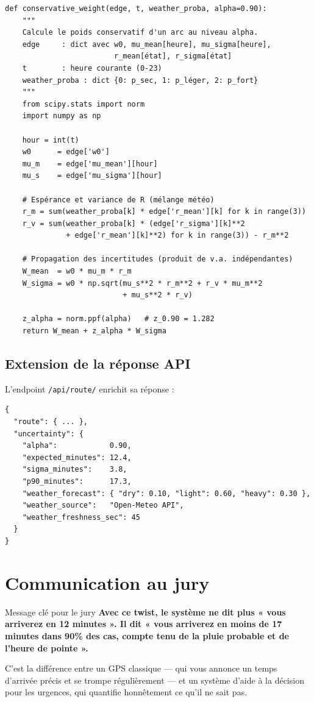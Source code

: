 \documentclass[12pt,a4paper]{article}
\theoremstyle{definition}
\theoremstyle{remark}
\begin{document}
\begin{verbatim}
def conservative_weight(edge, t, weather_proba, alpha=0.90):
    """
    Calcule le poids conservatif d'un arc au niveau alpha.
    edge     : dict avec w0, mu_mean[heure], mu_sigma[heure],
                         r_mean[état], r_sigma[état]
    t        : heure courante (0-23)
    weather_proba : dict {0: p_sec, 1: p_léger, 2: p_fort}
    """
    from scipy.stats import norm
    import numpy as np

    hour = int(t)
    w0      = edge['w0']
    mu_m    = edge['mu_mean'][hour]
    mu_s    = edge['mu_sigma'][hour]

    # Espérance et variance de R (mélange météo)
    r_m = sum(weather_proba[k] * edge['r_mean'][k] for k in range(3))
    r_v = sum(weather_proba[k] * (edge['r_sigma'][k]**2
              + edge['r_mean'][k]**2) for k in range(3)) - r_m**2

    # Propagation des incertitudes (produit de v.a. indépendantes)
    W_mean  = w0 * mu_m * r_m
    W_sigma = w0 * np.sqrt(mu_s**2 * r_m**2 + r_v * mu_m**2
                           + mu_s**2 * r_v)

    z_alpha = norm.ppf(alpha)   # z_0.90 = 1.282
    return W_mean + z_alpha * W_sigma
\end{verbatim}

\subsection{Extension de la réponse API}

L'endpoint \texttt{/api/route/} enrichit sa réponse :

\begin{verbatim}
{
  "route": { ... },
  "uncertainty": {
    "alpha":            0.90,
    "expected_minutes": 12.4,
    "sigma_minutes":    3.8,
    "p90_minutes":      17.3,
    "weather_forecast": { "dry": 0.10, "light": 0.60, "heavy": 0.30 },
    "weather_source":   "Open-Meteo API",
    "weather_freshness_sec": 45
  }
}
\end{verbatim}

\newpage

\section{Communication au jury}

\begin{jurybox}{Message clé pour le jury}
\textbf{Avec ce twist, le système ne dit plus « vous arriverez en
12 minutes ». Il dit « vous arriverez en moins de 17 minutes dans
90\% des cas, compte tenu de la pluie probable et de l'heure de
pointe ».}

\medskip
C'est la différence entre un GPS classique — qui vous annonce un
temps d'arrivée précis et se trompe régulièrement — et un système
d'aide à la décision pour les urgences, qui quantifie honnêtement
ce qu'il ne sait pas.
\end{jurybox}
\end{document}
